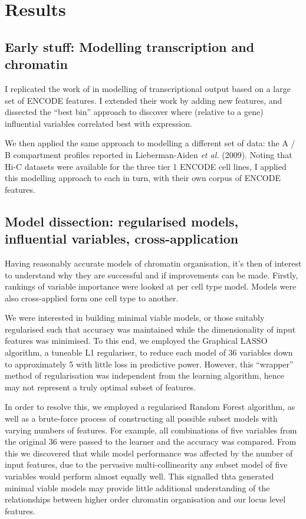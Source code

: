 \documentclass[a4paper,10pt,oneside]{book}
\begin{document}
\section{Results}\label{results}

\subsection{\textbf{Early stuff:} Modelling transcription and
chromatin}\label{early-stuff-modelling-transcription-and-chromatin}

I replicated the work of \citet{Dong2012} in modelling of
transcriptional output based on a large set of ENCODE features. I
extended their work by adding new features, and dissected the ``best
bin'' approach to discover where (relative to a gene) influential
variables correlated best with expression.

We then applied the same approach to modelling a different set of data:
the A / B compartment profiles reported in Lieberman-Aiden \emph{et al.}
(2009). Noting that Hi-C datasets were available for the three tier 1
ENCODE cell lines, I applied this modelling approach to each in turn,
with their own corpus of ENCODE features.

\subsection{\textbf{Model dissection}: regularised models, influential
variables,
cross-application}\label{model-dissection-regularised-models-influential-variables-cross-application}

Having reasonably accurate models of chromatin organisation, it's then
of interest to understand why they are successful and if improvements
can be made. Firstly, rankings of variable importance were looked at per
cell type model. Models were also cross-applied form one cell type to
another.

We were interested in building minimal viable models, or those suitably
regularised such that accuracy was maintained while the dimensionality
of input features was minimised. To this end, we employed the Graphical
LASSO algorithm, a tuneable L1 regulariser, to reduce each model of 36
variables down to approximately 5 with little loss in predictive power.
However, this ``wrapper'' method of regularisation was independent from
the learning algorithm, hence may not represent a truly optimal subset
of features.

In order to resolve this, we employed a regularised Random Forest
algorithm, as well as a brute-force process of constructing all possible
subset models with varying numbers of features. For example, all
combinations of five variables from the original 36 were passed to the
learner and the accuracy was compared. From this we discovered that
while model performance was affected by the number of input features,
due to the pervasive multi-collinearity any subset model of five
variables would perform almost equally well. This signalled thta
generated minimal viable models may provide little additional
understanding of the relationships between higher order chromatin
organisation and our locus level features.
\end{document}
